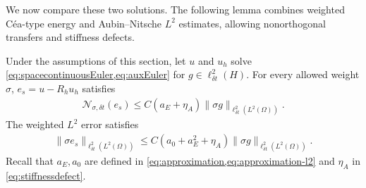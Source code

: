 \documentclass[print,wide,eng]{draft}
\begin{document}
We now compare these two solutions. The following lemma combines weighted C\'ea-type energy and Aubin--Nitsche $L^2$ estimates, allowing nonorthogonal transfers and stiffness defects.
%
\begin{lemma}\label{lem:spatialEuler}
Under the assumptions of this section, let $u$ and $u_h$ solve \cref{eq:spacecontinuousEuler,eq:auxEuler} for $g\in\ell_{\delta t}^2(H)$. For every allowed weight $\sigma$, $e_s=u-R_hu_h$ satisfies
\begin{align}\label{eq:spatialEulerError}
\mathcal N_{\sigma,{\delta t}}(e_s)
\leq C(a_E+\eta_A)\|\sigma g\|_{\ell_{\delta t}^2(L^2(\Omega))}.
\end{align}
The weighted $L^2$ error satisfies\vspace{-2mm}
\begin{align}\label{eq:spatialEulerL2Error}
\|\sigma e_s\|_{\ell_{\delta t}^2(L^2(\Omega))}
\leq C(a_0+a_E^2+\eta_A)\|\sigma g\|_{\ell_{\delta t}^2(L^2(\Omega))}.
\end{align}
Recall that $a_E,a_0$ are defined in \cref{eq:approximation,eq:approximation-l2} and $\eta_A$ in \cref{eq:stiffnessdefect}.
\end{lemma}
%
\end{document}
